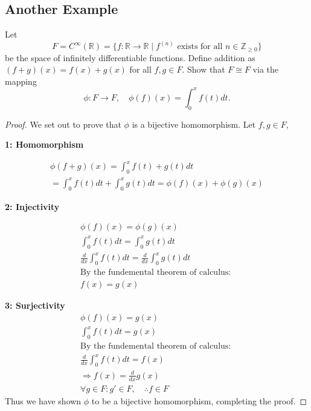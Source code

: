 \documentclass[12pt]{article}
\begin{document}
\subsection*{Another Example}
Let  
\[
F = C^\infty(\mathbb{R}) = \{ f: \mathbb{R} \to \mathbb{R} \mid f^{(n)} \text{ exists for all } n \in \mathbb{Z}_{\geq 0} \}
\]
be the space of infinitely differentiable functions. Define addition as \((f+g)(x) = f(x) + g(x)\) for all \( f, g \in F \). 
Show that \( F \cong F \) via the mapping  
\[
\phi : F \to F, \quad \phi(f)(x) = \int_0^x f(t) dt.
\]
\begin{proof}
    We set out to prove that \(\phi\) is a bijective homomorphism. 
    Let \(f,g \in F\),

    \noindent 
    \textbf{1: Homomorphism} 
    
    \begin{gather*}
        \phi (f + g)(x) = \displaystyle\int_{0}^{x} f(t) + g(t) dt \\ 
        = \displaystyle\int_{0}^{x} f(t)dt + \displaystyle\int_{0}^{x} g(t)dt
        = \phi(f)(x) + \phi(g)(x)
    \end{gather*}

    \noindent 
    \textbf{2: Injectivity} 

    \begin{gather*}
        \phi(f)(x) = \phi(g)(x) \\ 
        \displaystyle\int_{0}^{x} f(t)dt = \displaystyle\int_{0}^{x} g(t)dt \\
        \frac{d}{dx} \displaystyle\int_{0}^{x} f(t) dt 
        = \frac{d}{dx} \displaystyle\int_{0}^{x} g(t) dt \\ 
        \text{By the fundemental theorem of calculus: } \\ 
        f(x) = g(x)
    \end{gather*}

    \noindent 
    \textbf{3: Surjectivity} 
    \begin{gather*}
        \phi(f)(x) = g(x) \\ 
        \displaystyle\int_{0}^{x} f(t) dt = g(x) \\
        \text{By the fundemental theorem of calculus: } \\ 
        \frac{d}{dx} \displaystyle\int_{0}^{x} f(t)dt = f(x) \\
        \Rightarrow f(x) = \frac{d}{dx} g(x) \quad \\ 
        \forall g \in F : g' \in F, \quad \therefore f \in F
    \end{gather*}
    Thus we have shown \(\phi\) to be a bijective homomorphism, completing the proof.
    
\end{proof}
\end{document}
